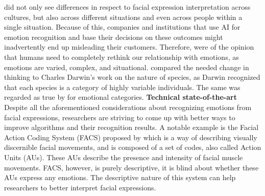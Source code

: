\newline\newline
\citet{Barrett:2019:EmotionalFromFacialMovements} did not only see differences in respect to facial expression interpretation across cultures, but also across different situations and even across people within a single situation. Because of this, companies and institutions that use AI for emotion recognition and base their decisions on these outcomes might inadvertently end up misleading their customers. Therefore, \citet{Barrett:2019:EmotionalFromFacialMovements} were of the opinion that humans need to completely rethink our relationship with emotions, as emotions are varied, complex, and situational. \citet{Barrett:2019:EmotionalFromFacialMovements} compared the needed change in thinking to Charles Darwin's work on the nature of species, as Darwin recognized that each species is a category of highly variable individuals. The same was regarded as true by \citet{Barrett:2019:EmotionalFromFacialMovements} for emotional categories.
\newline\newline\newline
\textbf{Technical state-of-the-art}\newline
Despite all the aforementioned considerations about recognizing emotions from facial expressions, researchers are striving to come up with better ways to improve algorithms and their recognition results.
\newline\newline
A notable example is the Facial Action Coding System (FACS) proposed by \citet{Ekman:2002:FACS} which is a way of describing visually discernible facial movements, and is composed of a set of codes, also called Action Units (AUs). These AUs describe the presence and intensity of facial muscle movements. FACS, however, is purely descriptive, it is blind about whether these AUs express any emotions. The descriptive nature of this system can help researchers to better interpret facial expressions.

